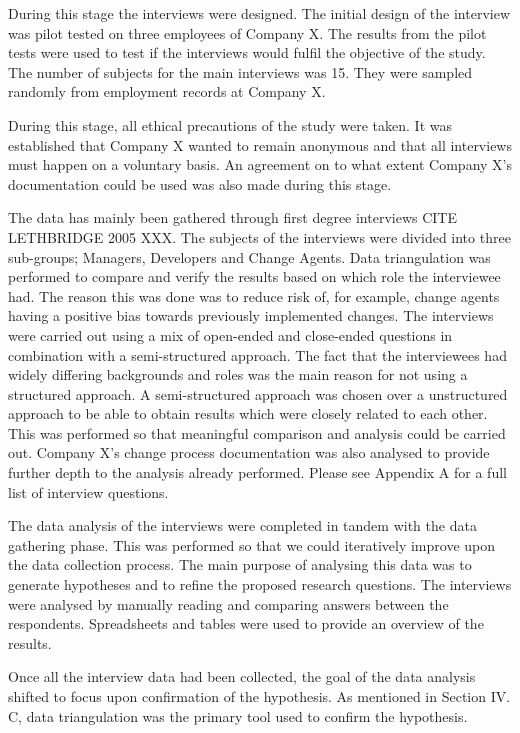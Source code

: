 \documentclass[times, 10pt,twocolumn]{Article}
\begin{document}
During this stage the interviews were designed. The initial design of the interview was pilot tested on three employees of Company X. The results from the pilot tests were used to test if the interviews would fulfil the objective of the study. The number of subjects for the main interviews was 15. They were sampled randomly from employment records at Company X. 

During this stage, all ethical precautions of the study were taken. It was established that Company X wanted to remain anonymous and that all interviews must happen on a voluntary basis. An agreement on to what extent Company X's documentation could be used was also made during this stage.

The data has mainly been gathered through first degree interviews CITE LETHBRIDGE 2005 XXX. The subjects of the interviews were divided into three sub-groups; Managers, Developers and Change Agents. Data triangulation was performed to compare and verify the results based on which role the interviewee had. The reason this was done was to reduce risk of, for example, change agents having a positive bias towards previously implemented changes. The interviews were carried out using a mix of open-ended and close-ended questions in combination with a semi-structured approach. The fact that the interviewees had widely differing backgrounds and roles was the main reason for not using a structured approach. A semi-structured approach was chosen over a unstructured approach to be able to obtain results which were closely related to each other. This was performed so that meaningful comparison and analysis could be carried out. Company X's change process documentation was also analysed to provide further depth to the analysis already performed. Please see Appendix A for a full list of interview questions.

The data analysis of the interviews were completed in tandem with the data gathering phase. This was performed so that we could iteratively improve upon the data collection process. The main purpose of analysing this data was to generate hypotheses and to refine the proposed research questions. The interviews were analysed by manually reading and comparing answers between the respondents. Spreadsheets and tables were used to provide an overview of the results.

Once all the interview data had been collected, the goal of the data analysis shifted to focus upon confirmation of the hypothesis. As mentioned in Section IV. C, data triangulation was the primary tool used to confirm the hypothesis. 
\end{document}
